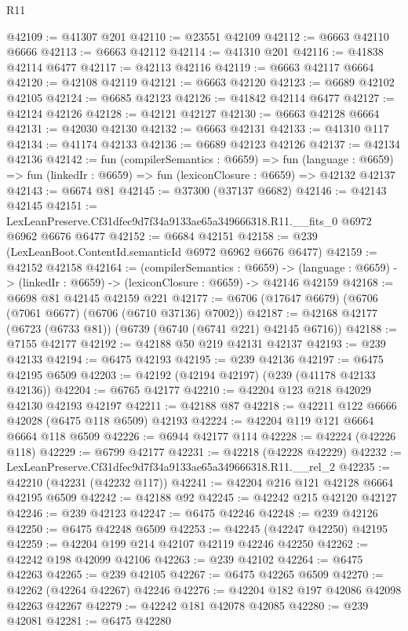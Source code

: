 \begin{lexlean}{R11}
\begin{coremodule}
@42109 := @41307 @201
@42110 := @23551 @42109
@42112 := @6663 @42110 @6666
@42113 := @6663 @42112
@42114 := @41310 @201
@42116 := @41838 @42114 @6477
@42117 := @42113 @42116
@42119 := @6663 @42117 @6664
@42120 := @42108 @42119
@42121 := @6663 @42120
@42123 := @6689 @42102 @42105
@42124 := @6685 @42123
@42126 := @41842 @42114 @6477
@42127 := @42124 @42126
@42128 := @42121 @42127
@42130 := @6663 @42128 @6664
@42131 := @42030 @42130
@42132 := @6663 @42131
@42133 := @41310 @117
@42134 := @41174 @42133
@42136 := @6689 @42123 @42126
@42137 := @42134 @42136
@42142 := fun (compilerSemantics : @6659) =>
  fun (language : @6659) => fun (linkedIr : @6659) => fun (lexiconClosure : @6659) => @42132 @42137
@42143 := @6674 @81
@42145 := @37300 (@37137 @6682)
@42146 := @42143 @42145
@42151 := LexLeanPreserve.Cf31dfec9d7f34a9133ae65a349666318.R11.__fits_0 @6972 @6962 @6676 @6477
@42152 := @6684 @42151
@42158 := @239 (LexLeanBoot.ContentId.semanticId @6972 @6962 @6676 @6477)
@42159 := @42152 @42158
@42164 := (compilerSemantics : @6659) ->
  (language : @6659) -> (linkedIr : @6659) -> (lexiconClosure : @6659) -> @42146 @42159
@42168 := @6698 @81 @42145 @42159 @221
@42177 := @6706 (@17647 @6679) (@6706 (@7061 @6677) (@6706 (@6710 @37136) @7002))
@42187 := @42168 @42177 (@6723 (@6733 @81)) (@6739 (@6740 (@6741 @221) @42145 @6716))
@42188 := @7155 @42177
@42192 := @42188 @50 @219 @42131 @42137
@42193 := @239 @42133
@42194 := @6475 @42193
@42195 := @239 @42136
@42197 := @6475 @42195 @6509
@42203 := @42192 (@42194 @42197) (@239 (@41178 @42133 @42136))
@42204 := @6765 @42177
@42210 := @42204 @123 @218 @42029 @42130 @42193 @42197
@42211 := @42188 @87
@42218 := @42211 @122 @6666 @42028 (@6475 @118 @6509) @42193
@42224 := @42204 @119 @121 @6664 @6664 @118 @6509
@42226 := @6944 @42177 @114
@42228 := @42224 (@42226 @118)
@42229 := @6799 @42177
@42231 := @42218 (@42228 @42229)
@42232 := LexLeanPreserve.Cf31dfec9d7f34a9133ae65a349666318.R11.__rel_2
@42235 := @42210 (@42231 (@42232 @117))
@42241 := @42204 @216 @121 @42128 @6664 @42195 @6509
@42242 := @42188 @92
@42245 := @42242 @215 @42120 @42127
@42246 := @239 @42123
@42247 := @6475 @42246
@42248 := @239 @42126
@42250 := @6475 @42248 @6509
@42253 := @42245 (@42247 @42250) @42195
@42259 := @42204 @199 @214 @42107 @42119 @42246 @42250
@42262 := @42242 @198 @42099 @42106
@42263 := @239 @42102
@42264 := @6475 @42263
@42265 := @239 @42105
@42267 := @6475 @42265 @6509
@42270 := @42262 (@42264 @42267) @42246
@42276 := @42204 @182 @197 @42086 @42098 @42263 @42267
@42279 := @42242 @181 @42078 @42085
@42280 := @239 @42081
@42281 := @6475 @42280

\end{coremodule}
\end{lexlean}
